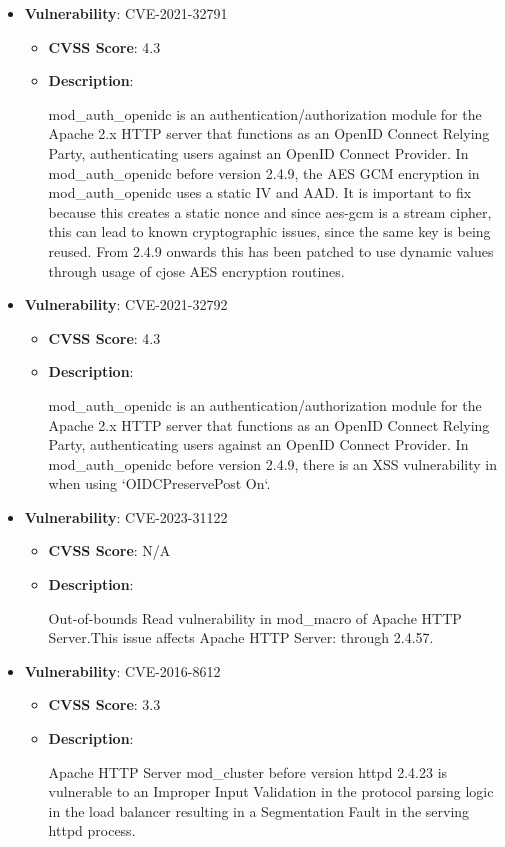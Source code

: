 \documentclass{article}
\begin{document}
\begin{itemize}
        \item \textbf{Vulnerability}: CVE-2021-32791
        \begin{itemize}
            \item \textbf{CVSS Score}:  4.3 
            \item \textbf{Description}:
            \parbox[t]{0.9\linewidth}{
                \ttfamily mod\_auth\_openidc is an authentication/authorization module for the Apache 2.x HTTP server that functions as an OpenID Connect Relying Party, authenticating users against an OpenID Connect Provider. In mod\_auth\_openidc before version 2.4.9, the AES GCM encryption in mod\_auth\_openidc uses a static IV and AAD. It is important to fix because this creates a static nonce and since aes-gcm is a stream cipher, this can lead to known cryptographic issues, since the same key is being reused. From 2.4.9 onwards this has been patched to use dynamic values through usage of cjose AES encryption routines.
            }
        \end{itemize}
    
        \item \textbf{Vulnerability}: CVE-2021-32792
        \begin{itemize}
            \item \textbf{CVSS Score}:  4.3 
            \item \textbf{Description}:
            \parbox[t]{0.9\linewidth}{
                \ttfamily mod\_auth\_openidc is an authentication/authorization module for the Apache 2.x HTTP server that functions as an OpenID Connect Relying Party, authenticating users against an OpenID Connect Provider. In mod\_auth\_openidc before version 2.4.9, there is an XSS vulnerability in when using `OIDCPreservePost On`.
            }
        \end{itemize}
    
        \item \textbf{Vulnerability}: CVE-2023-31122
        \begin{itemize}
            \item \textbf{CVSS Score}:  N/A 
            \item \textbf{Description}:
            \parbox[t]{0.9\linewidth}{
                \ttfamily Out-of-bounds Read vulnerability in mod\_macro of Apache HTTP Server.This issue affects Apache HTTP Server: through 2.4.57.
            }
        \end{itemize}
    
        \item \textbf{Vulnerability}: CVE-2016-8612
        \begin{itemize}
            \item \textbf{CVSS Score}:  3.3 
            \item \textbf{Description}:
            \parbox[t]{0.9\linewidth}{
                \ttfamily Apache HTTP Server mod\_cluster before version httpd 2.4.23 is vulnerable to an Improper Input Validation in the protocol parsing logic in the load balancer resulting in a Segmentation Fault in the serving httpd process.
            }
        \end{itemize}
    

\end{itemize}
\end{document}
